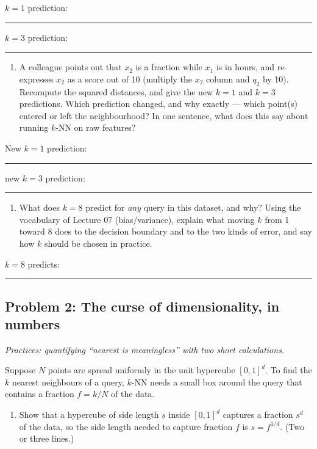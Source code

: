 \documentclass[
  11pt,
]{article}
\providecommand{\tightlist}{%
  \setlength{\itemsep}{0pt}\setlength{\parskip}{0pt}}
\newcommand{\answerspace}[1]{\par\vspace*{#1}}  %
\newcommand{\blank}[1][1.2in]{\rule{#1}{0.4pt}}
\newcommand{\answerpage}{\clearpage}
\begin{document}
\(k = 1\) prediction: \blank[0.8in]\quad \(k = 3\) prediction:
\blank[0.8in]

\answerspace{1.5in}

\begin{enumerate}
\def\labelenumi{(\alph{enumi})}
\setcounter{enumi}{1}
\tightlist
\item
  A colleague points out that \(x_2\) is a fraction while \(x_1\) is in
  hours, and re-expresses \(x_2\) as a score out of 10 (multiply the
  \(x_2\) column and \(q_2\) by 10). Recompute the squared distances,
  and give the new \(k = 1\) and \(k = 3\) predictions. Which prediction
  changed, and why exactly --- which point(s) entered or left the
  neighbourhood? In one sentence, what does this say about running
  \(k\)-NN on raw features?
\end{enumerate}

New \(k = 1\) prediction: \blank[0.8in]\quad new \(k = 3\) prediction:
\blank[0.8in]

\answerspace{2.8in}
\answerpage

\begin{enumerate}
\def\labelenumi{(\alph{enumi})}
\setcounter{enumi}{2}
\tightlist
\item
  What does \(k = 8\) predict for \emph{any} query in this dataset, and
  why? Using the vocabulary of Lecture 07 (bias/variance), explain what
  moving \(k\) from 1 toward 8 does to the decision boundary and to the
  two kinds of error, and say how \(k\) should be chosen in practice.
\end{enumerate}

\(k = 8\) predicts: \blank[1.2in]

\answerspace{2in}

\answerpage

\subsection{Problem 2: The curse of dimensionality, in
numbers}\label{problem-2-the-curse-of-dimensionality-in-numbers}

\emph{Practices: quantifying ``nearest is meaningless'' with two short
calculations.}

Suppose \(N\) points are spread uniformly in the unit hypercube
\([0,1]^d\). To find the \(k\) nearest neighbours of a query, \(k\)-NN
needs a small box around the query that contains a fraction \(f = k/N\)
of the data.

\begin{enumerate}
\def\labelenumi{(\alph{enumi})}
\tightlist
\item
  Show that a hypercube of side length \(s\) inside \([0,1]^d\) captures
  a fraction \(s^d\) of the data, so the side length needed to capture
  fraction \(f\) is \(s = f^{1/d}\). (Two or three lines.)
\end{enumerate}
\end{document}
